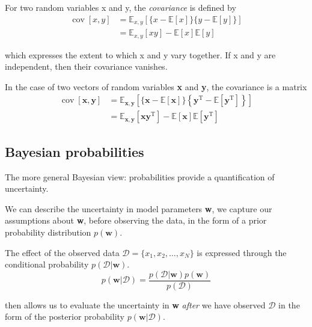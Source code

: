 \documentclass[5p,sort&compress]{elsarticle}
\begin{document}
For two random variables x and y, the \textit{covariance} is defined by
\begin{equation}
\begin{aligned} \operatorname{cov}[x, y] &=\mathbb{E}_{x, y}[\{x-\mathbb{E}[x]\}\{y-\mathbb{E}[y]\}] \\ &=\mathbb{E}_{x, y}[x y]-\mathbb{E}[x] \mathbb{E}[y] \end{aligned}
\end{equation}

which expresses the extent to which x and y vary together. If x and y are independent, then their covariance vanishes.

In the case of two vectors of random variables \textbf{x} and \textbf{y}, the covariance is a matrix
\begin{equation}
\begin{aligned} \operatorname{cov}[\mathbf{x}, \mathbf{y}] &=\mathbb{E}_{\mathbf{x}, \mathbf{y}}\left[\{\mathbf{x}-\mathbb{E}[\mathbf{x}]\}\left\{\mathbf{y}^{\mathrm{T}}-\mathbb{E}\left[\mathbf{y}^{\mathrm{T}}\right]\right\}\right] \\ &=\mathbb{E}_{\mathbf{x}, \mathbf{y}}\left[\mathbf{x} \mathbf{y}^{\mathrm{T}}\right]-\mathbb{E}[\mathbf{x}] \mathbb{E}\left[\mathbf{y}^{\mathrm{T}}\right] \end{aligned}
\end{equation}


\subsection{Bayesian probabilities}

The more general Bayesian view: probabilities provide a quantification of uncertainty. 

We can describe the uncertainty in model parameters \textbf{w}, we capture our assumptions about \textbf{w}, before observing the data, in the form of a prior probability distribution $p(\textbf{w})$.

The effect of the observed data $\mathcal{D} = \{x_1, x_2, \ldots, x_N\}$ is expressed through the conditional probability $p(\mathcal{D}|\textbf{w})$.
\begin{equation}
p(\mathbf{w} | \mathcal{D})=\frac{p(\mathcal{D} | \mathbf{w}) p(\mathbf{w})}{p(\mathcal{D})}
\end{equation}

then allows us to evaluate the uncertainty in \textbf{w} \textit{after} we have observed $\mathcal{D}$ in the form of the posterior probability $p(\textbf{w}|\mathcal{D})$.
\end{document}
